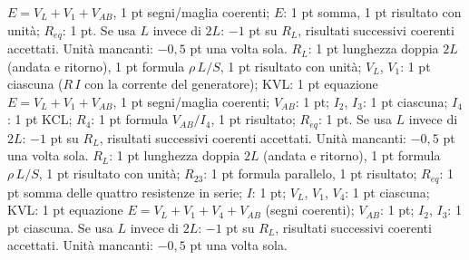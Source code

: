\begin{esercizio}[14]
\begin{solution}
{    $E=V_L+V_1+V_{AB}$, 1 pt segni/maglia coerenti; $E$: 1 pt somma, 1 pt risultato con unità;
    $R_{eq}$: 1 pt. Se usa $L$ invece di $2L$: $-1$ pt su $R_L$, risultati successivi coerenti accettati. Unità mancanti: $-0{,}5$ pt una volta sola.}
  {$R_L$: 1 pt lunghezza doppia $2L$ (andata e ritorno), 1 pt formula $\rho\,L/S$, 1 pt risultato
    con unità; $V_L$, $V_1$: 1 pt ciascuna ($R\,I$ con la corrente del generatore); KVL: 1 pt equazione
    $E=V_L+V_1+V_{AB}$, 1 pt segni/maglia coerenti; $V_{AB}$: 1 pt; $I_2$, $I_3$: 1 pt ciascuna; $I_4$: 1 pt
    KCL; $R_4$: 1 pt formula $V_{AB}/I_4$, 1 pt risultato; $R_{eq}$: 1 pt. Se usa $L$ invece di $2L$:
    $-1$ pt su $R_L$, risultati successivi coerenti accettati. Unità mancanti: $-0{,}5$ pt una volta sola.}
  {$R_L$: 1 pt lunghezza doppia $2L$ (andata e ritorno), 1 pt formula $\rho\,L/S$, 1 pt risultato
    con unità; $R_{23}$: 1 pt formula parallelo, 1 pt risultato; $R_{eq}$: 1 pt somma delle quattro
    resistenze in serie; $I$: 1 pt; $V_L$, $V_1$, $V_4$: 1 pt ciascuna; KVL: 1 pt equazione
    $E=V_L+V_1+V_4+V_{AB}$ (segni coerenti); $V_{AB}$: 1 pt; $I_2$, $I_3$: 1 pt ciascuna.
    Se usa $L$ invece di $2L$: $-1$ pt su $R_L$, risultati successivi coerenti accettati. Unità mancanti: $-0{,}5$ pt una volta sola.}
\end{solution}
\end{esercizio}
